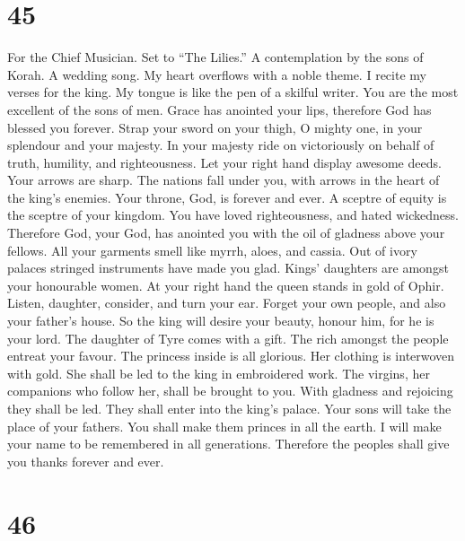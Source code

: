 \hypertarget{section-44}{%
\section{45}\label{section-44}}

For the Chief Musician. Set to ``The Lilies.'' A contemplation by the
sons of Korah. A wedding song.  My heart overflows with a
noble theme. I recite my verses for the king. My tongue is like the pen
of a skilful writer.  You are the most excellent of the sons
of men. Grace has anointed your lips, therefore God has blessed you
forever.  Strap your sword on your thigh, O mighty one, in
your splendour and your majesty.  In your majesty ride on
victoriously on behalf of truth, humility, and righteousness. Let your
right hand display awesome deeds.  Your arrows are sharp.
The nations fall under you, with arrows in the heart of the king's
enemies.  Your throne, God, is forever and ever. A sceptre
of equity is the sceptre of your kingdom.  You have loved
righteousness, and hated wickedness. Therefore God, your God, has
anointed you with the oil of gladness above your fellows. 
All your garments smell like myrrh, aloes, and cassia. Out of ivory
palaces stringed instruments have made you glad.  Kings'
daughters are amongst your honourable women. At your right hand the
queen stands in gold of Ophir.  Listen, daughter, consider,
and turn your ear. Forget your own people, and also your father's house.
 So the king will desire your beauty, honour him, for he is
your lord.  The daughter of Tyre comes with a gift. The
rich amongst the people entreat your favour.  The princess
inside is all glorious. Her clothing is interwoven with gold.
 She shall be led to the king in embroidered work. The
virgins, her companions who follow her, shall be brought to you.
 With gladness and rejoicing they shall be led. They shall
enter into the king's palace.  Your sons will take the
place of your fathers. You shall make them princes in all the earth.
 I will make your name to be remembered in all generations.
Therefore the peoples shall give you thanks forever and ever.

\hypertarget{section-45}{%
\section{46}\label{section-45}}

